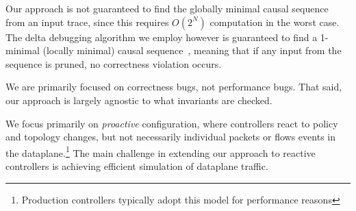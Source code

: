 Our approach is not guaranteed to find the globally minimal
causal sequence from an input trace, since this requires $O(2^N)$ computation in the worst case.
The delta debugging algorithm we employ however is guaranteed to find a 1-minimal
(locally minimal) causal sequence~\cite{Zeller:2002:SIF:506201.506206},
meaning that if any input from the sequence is pruned, no correctness violation
occurs.

We are primarily focused on correctness bugs, not performance bugs. That said,
our approach is largely agnostic to what invariants are
checked.

 We focus primarily on
\emph{proactive} configuration, where controllers react to policy and topology changes, but
not necessarily individual packets or flows events in the
dataplane.\footnote{Production controllers typically adopt this model for performance reasons}
The main challenge in extending our approach to reactive controllers is
achieving efficient simulation of dataplane traffic.

